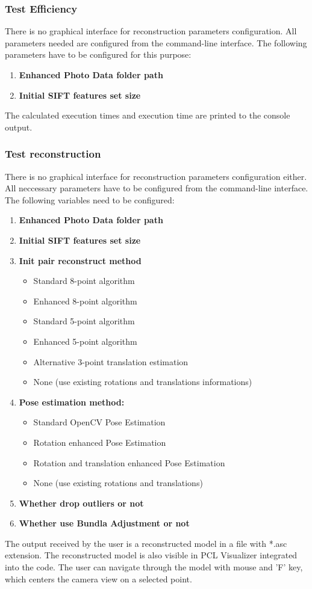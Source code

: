 \subsubsection{Test Efficiency}
There is no graphical interface for reconstruction parameters configuration. All parameters needed are configured from the command-line interface. The following parameters have to be configured for this purpose:
\begin{enumerate}
\item \textbf{Enhanced Photo Data folder path}
\item \textbf{Initial SIFT features set size}
\end{enumerate}
The calculated execution times and execution time are printed to the console output.
\subsubsection{Test reconstruction}
There is no graphical interface for reconstruction parameters configuration either. All neccessary parameters have to be configured from the command-line interface. The following variables need to be configured:
\begin{enumerate}
\item \textbf{Enhanced Photo Data folder path}
\item \textbf{Initial SIFT features set size}
\item \textbf{Init pair reconstruct method}
\begin{itemize}
\item Standard 8-point algorithm
\item Enhanced 8-point algorithm
\item Standard 5-point algorithm
\item Enhanced 5-point algorithm
\item Alternative 3-point translation estimation
\item None (use existing rotations and translations informations)
\end{itemize}
\item \textbf{Pose estimation method:}
\begin{itemize}
\item Standard OpenCV Pose Estimation
\item Rotation enhanced Pose Estimation 
\item Rotation and translation enhanced Pose Estimation
\item None (use existing rotations and translations)
\end{itemize}
\item \textbf{Whether drop outliers or not}
\item \textbf{Whether use Bundla Adjustment or not}
\end{enumerate}
The output received by the user is a reconstructed model in a file with *.asc extension. The reconstructed model is also visible in PCL Visualizer integrated into the code. The user can navigate through the model with mouse and 'F' key, which centers the camera view on a selected point.
